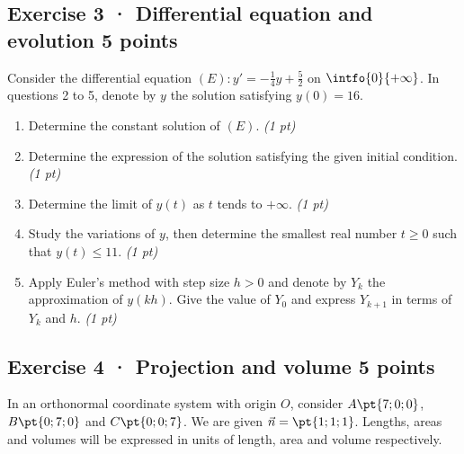 \mxnewpage{}

\subsection*{Exercise 3 · Differential equation and evolution \hfill 5 points}Consider the differential equation $(E):y'=-\frac1{4}y+\frac{5}{2}$ on $\intfo{0}{+\infty}$. In questions 2 to 5, denote by $y$ the solution satisfying $y(0)=16$.

\begin{enumerate}

\item Determine the constant solution of $(E)$. \hfill\textit{(1 pt)}

\item Determine the expression of the solution satisfying the given initial condition. \hfill\textit{(1 pt)}

\item Determine the limit of $y(t)$ as $t$ tends to $+\infty$. \hfill\textit{(1 pt)}

\item Study the variations of $y$, then determine the smallest real number $t\ge0$ such that $y(t)\le11$. \hfill\textit{(1 pt)}

\item Apply Euler's method with step size $h>0$ and denote by $Y_k$ the approximation of $y(kh)$. Give the value of $Y_0$ and express $Y_{k+1}$ in terms of $Y_k$ and $h$. \hfill\textit{(1 pt)}

\end{enumerate}

\subsection*{Exercise 4 · Projection and volume \hfill 5 points}In an orthonormal coordinate system with origin $O$, consider $A\pt{7;0;0}$, $B\pt{0;7;0}$ and $C\pt{0;0;7}$. We are given $\vec n=\pt{1;1;1}$. Lengths, areas and volumes will be expressed in units of length, area and volume respectively.

